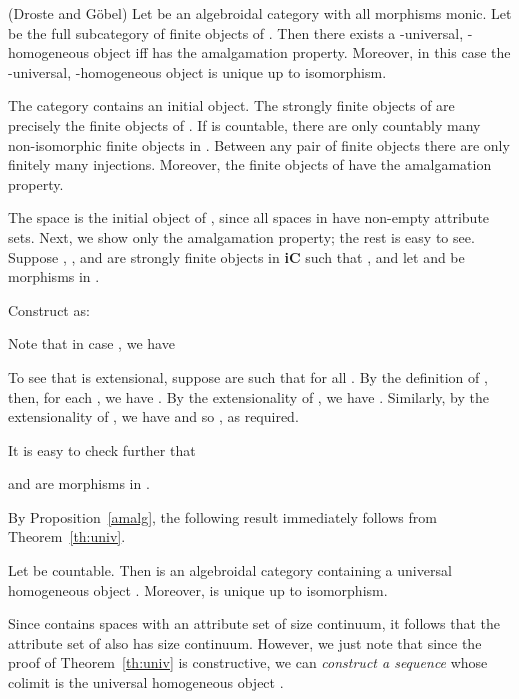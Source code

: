 \documentclass{LMCS}
\let\pf\proof
\let\epf\endproof
\begin{document}
\begin{thm}\label{th:univ} (Droste and G\"{o}bel)
  Let  be an algebroidal category with all morphisms monic. 
  Let  be the full subcategory of finite objects of .  Then there exists a -universal, -homogeneous object iff  has the amalgamation
  property.  Moreover, in this case the -universal, -homogeneous object is unique up to isomorphism. 
\end{thm}


\begin{prop}\label{amalg} The category 
  contains an initial object. The strongly finite objects of
   are precisely the finite objects of . If  is countable, there are only countably many
  non-isomorphic finite objects in . 
  Between any pair of finite objects there are only finitely
  many injections. Moreover, the finite objects of  have the amalgamation property. 
\end{prop}

\pf The space  is the initial object of
, since all spaces in 
have non-empty attribute sets. Next, we show only the amalgamation
property; the rest is easy to see.  Suppose ,
, and  are
strongly finite objects in {\bf iC} such that , and let
 and  be morphisms in . 


Construct  as:


Note that in case ,  we have

To see that  is extensional,
suppose  are such that
 for all . 
By the definition of  , then,
for each , we have
. By the extensionality of  , we have
. Similarly, by the extensionality of , we have
 and so , as required. 

It is easy to check further that

and  
are morphisms in . 
\epf

By Proposition~\ref{amalg}, the following result immediately follows from
Theorem~\ref{th:univ}. 

\begin{thm}\label{thm:iCbifalgebroidal}
  Let  be countable. Then  is an
  algebroidal category containing a universal homogeneous object . 
  Moreover,  is unique up to isomorphism. 
\end{thm}

  Since  contains spaces with an attribute set of
  size continuum, it follows that the attribute set of  also has
  size continuum. However, we just note that since the proof of
  Theorem~\ref{th:univ} is constructive, we can
  \emph{construct a sequence}  whose
  colimit is the universal homogeneous object . 
\end{document}
